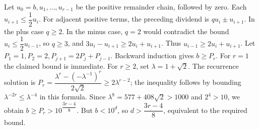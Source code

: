 Let $u_0=b,u_1,\ldots,u_{r-1}$ be the positive remainder chain, followed by zero. Each $u_{i+1}\le\dfrac{1}{2}u_i$. For adjacent positive terms, the preceding dividend is $qu_i\pm u_{i+1}$. In the plus case $q\ge2$. In the minus case, $q=2$ would contradict the bound $u_i\le\dfrac{1}{2}u_{i-1}$, so $q\ge3$, and $3u_i-u_{i+1}\ge2u_i+u_{i+1}$. Thus $u_{i-1}\ge2u_i+u_{i+1}$. Let $P_1=1,P_2=2,P_{j+1}=2P_j+P_{j-1}$. Backward induction gives $b\ge P_r$. For $r=1$ the claimed bound is immediate. For $r\ge2$, set $\lambda=1+\sqrt2$. The recurrence solution is $P_r=\dfrac{\lambda^r-(-\lambda^{-1})^r}{2\sqrt2}\ge2\lambda^{r-2}$; the inequality follows by bounding $\lambda^{-2r}\le\lambda^{-4}$ in this formula. Since $\lambda^8=577+408\sqrt2>1000$ and $2^4>10$, we obtain $b\ge P_r>10^{\dfrac{3r-4}{8}}$. But $b<10^d$, so $d>\dfrac{3r-4}{8}$, equivalent to the required bound.
